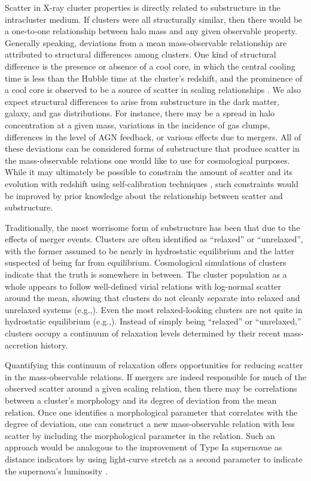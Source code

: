 \documentclass{aastex} \usepackage{natbib}
\begin{document}
Scatter in X-ray cluster properties is directly related to
substructure in the intracluster medium.  If clusters were all
structurally similar, then there would be a one-to-one relationship
between halo mass and any given observable property.  Generally
speaking, deviations from a mean mass-observable relationship are
attributed to structural differences among clusters.  One kind of
structural difference is the presence or absence of a cool core, in
which the central cooling time is less than the Hubble time at the
cluster's redshift, and the prominence of a cool core is observed to
be a source of scatter in scaling relationships
\citep{1994MNRAS.267..779F,1998ApJ...504...27M,2002ApJ...576..601V,2004ApJ...613..811M}.
We also expect structural differences to arise from substructure in
the dark matter, galaxy, and gas distributions.  For instance, there
may be a spread in halo concentration at a given mass, variations in
the incidence of gas clumps, differences in the level of AGN feedback,
or various effects due to mergers.  All of these deviations can be
considered forms of substructure that produce scatter in the
mass-observable relations one would like to use for cosmological
purposes.  While it may ultimately be possible to constrain the amount
of scatter and its evolution with redshift using self-calibration
techniques \citep{2005PhRvD..72d3006L}, such constraints would be
improved by prior knowledge about the relationship between scatter and
substructure.

Traditionally, the most worrisome form of substructure has been that
due to the effects of merger events.  Clusters are often identified as
``relaxed'' or ``unrelaxed'', with the former assumed to be nearly in
hydrostatic equilibrium and the latter suspected of being far from
equilibrium.  Cosmological simulations of clusters indicate that the
truth is somewhere in between.  The cluster population as a whole
appears to follow well-defined virial relations with log-normal
scatter around the mean, showing that clusters do not cleanly separate
into relaxed and unrelaxed systems (e.g.,\cite{2007astro.ph..2241E}).
Even the most relaxed-looking clusters are not quite in hydrostatic
equilibrium (e.g.,\cite{2006ApJ...650..128K}).  Instead of simply
being ``relaxed'' or ``unrelaxed,'' clusters occupy a continuum of
relaxation levels determined by their recent mass-accretion history.

Quantifying this continuum of relaxation offers opportunities for
reducing scatter in the mass-observable relations.  If mergers are
indeed responsible for much of the observed scatter around a given
scaling relation, then there may be correlations between a cluster's
morphology and its degree of deviation from the mean relation.  Once
one identifies a morphological parameter that correlates with the
degree of deviation, one can construct a new mass-observable relation
with less scatter by including the morphological parameter in the
relation.  Such an approach would be analogous to the improvement of
Type Ia supernovae as distance indicators by using light-curve stretch
as a second parameter to indicate the supernova's luminosity
\citep{1993ApJ...413L.105P,1996ApJ...473...88R}.
\end{document}
